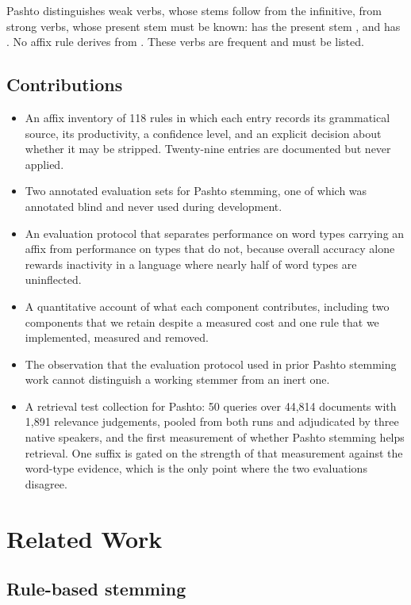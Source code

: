\documentclass[conference]{IEEEtran}
\newcommand{\ps}[1]{{\pashtofont\textpashto{#1}}}
\begin{document}
Pashto distinguishes weak verbs, whose stems follow from the infinitive, from
strong verbs, whose present stem must be known: \ps{لیدل} has the present stem
\ps{وین}, and \ps{تلل} has \ps{ځ}. No affix rule derives \ps{وین} from
\ps{لیدل}. These verbs are frequent and must be listed.

\subsection{Contributions}

\begin{itemize}
\item An affix inventory of 118 rules in which each entry records its
grammatical source, its productivity, a confidence level, and an explicit
decision about whether it may be stripped. Twenty-nine entries are documented
but never applied.
\item Two annotated evaluation sets for Pashto stemming, one of which was
annotated blind and never used during development.
\item An evaluation protocol that separates performance on word types carrying
an affix from performance on types that do not, because overall accuracy alone
rewards inactivity in a language where nearly half of word types are
uninflected.
\item A quantitative account of what each component contributes, including two
components that we retain despite a measured cost and one rule that we
implemented, measured and removed.
\item The observation that the evaluation protocol used in prior Pashto
stemming work cannot distinguish a working stemmer from an inert one.
\item A retrieval test collection for Pashto: 50 queries over 44{,}814
documents with 1{,}891 relevance judgements, pooled from both runs and
adjudicated by three native speakers, and the first measurement of whether
Pashto stemming helps retrieval. One suffix is gated on the strength of that
measurement against the word-type evidence, which is the only point where the
two evaluations disagree.
\end{itemize}

\section{Related Work}

\subsection{Rule-based stemming}
\end{document}
